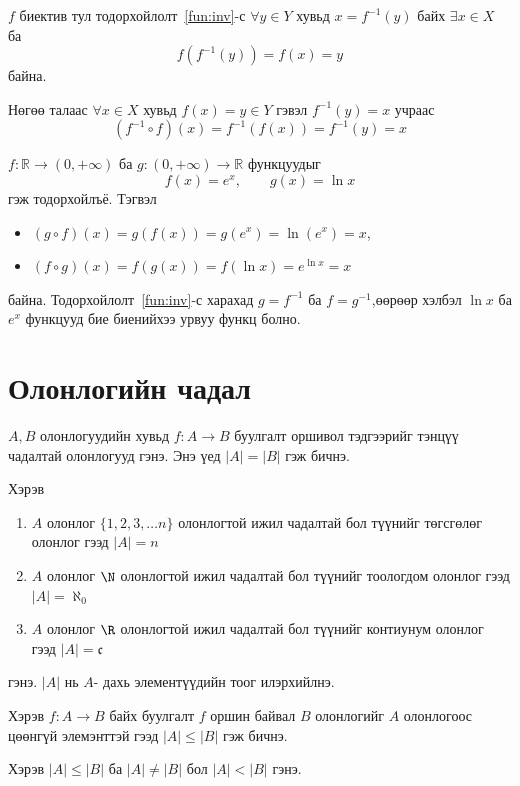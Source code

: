\begin{prof}
$f$ биектив тул тодорхойлолт~\ref{fun:inv}-с $\forall y\in Y$ хувьд
$x=f^{-1}(y)$ байх $\exists x\in X$ ба
\[
f\!\left(f^{-1}(y)\right)=f(x)=y
\]
байна. 

Нөгөө талаас $\forall x\in X$ хувьд $f(x)=y\in Y$ гэвэл $f^{-1}(y)=x$ учраас
\[
(f^{-1}\circ f)(x)=f^{-1}(f(x))=f^{-1}(y)=x
\]
\end{prof}

\begin{example}
$f:\mathbb{R}\to(0,+\infty)$ ба $g:(0,+\infty)\to\mathbb{R}$ функцуудыг
\[
f(x)=e^x,\qquad g(x)=\ln x
\]
гэж тодорхойлъё. Тэгвэл
\begin{itemize}
    \item $(g\circ f)(x)=g(f(x))=g(e^x)=\ln(e^x)=x$,
    \item $(f\circ g)(x)=f(g(x))=f(\ln x)=e^{\ln x}=x$
    \end{itemize} байна. 
Тодорхойлолт~\ref{fun:inv}-с харахад $g=f^{-1}$ ба $f=g^{-1}$,өөрөөр хэлбэл $\ln x$ ба $e^x$ функцууд бие биенийхээ урвуу функц болно.
\end{example}
\section{Олонлогийн чадал}
\begin{definition}
$A,B$ олонлогуудийн хувьд $f:A\to B$  буулгалт оршивол тэдгээрийг тэнцүү чадалтай олонлогууд гэнэ. Энэ үед $|A|=|B|$ гэж бичнэ. 


Хэрэв 
\begin{enumerate}
    \item $A$ олонлог $\{1, 2, 3, \ldots n\}$ олонлогтой ижил чадалтай бол түүнийг төгсгөлөг олонлог гээд $|A|=n$
    \item $A$ олонлог $\N$ олонлогтой ижил чадалтай бол түүнийг тоологдом олонлог гээд $|A|=\aleph_0$
    \item $A$ олонлог $\R$ олонлогтой ижил чадалтай бол түүнийг контиунум олонлог гээд $|A|=\mathfrak{c}$
\end{enumerate} гэнэ. $|A|$ нь $A$- дахь элементүүдийн тоог илэрхийлнэ.
\end{definition}

\begin{definition}
Хэрэв $f:A\to B$ байх  буулгалт $f$ оршин байвал $B$ олонлогийг $A$ олонлогоос цөөнгүй элемэнттэй гээд $|A|\le |B|$ гэж бичнэ.

Хэрэв $|A|\le |B|$ ба $|A|\ne |B|$ бол  $|A|<|B|$ гэнэ.
\end{definition}

